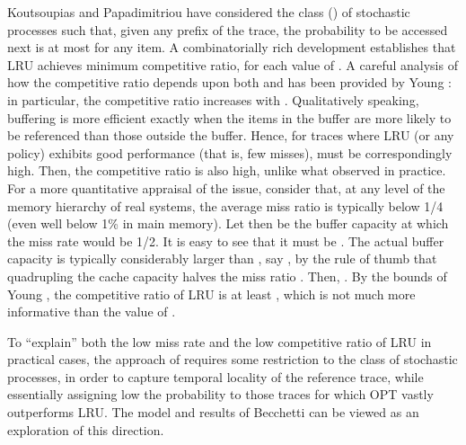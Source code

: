 \documentclass[11pt,a4paper]{article}
\theoremstyle{definition}
\theoremstyle{remark}
\begin{document}
Koutsoupias and Papadimitriou \cite{KoutsoupiasP00} have considered
the class  () of stochastic
processes such that, given any prefix of the trace, the probability to
be accessed next is at most  for any item.  A
combinatorially rich development establishes that LRU achieves minimum
competitive ratio, for each value of .  A careful analysis
of how the competitive ratio depends upon both  and  has
been provided by Young \cite{Young98}: in particular, the competitive
ratio increases with . Qualitatively speaking, buffering is
more efficient exactly when the items in the buffer are more likely to
be referenced than those outside the buffer. Hence, for traces where
LRU (or any policy) exhibits good performance (that is, few misses),
 must be correspondingly high. Then, the 
competitive ratio is also high, unlike what observed in practice.  For
a more quantitative appraisal of the issue, consider that, at any level
of the memory hierarchy of real systems, the average miss ratio is
typically below 1/4 (even well below 1\% in main memory). Let then
 be the buffer capacity at which the miss rate would be
1/2. It is easy to see that it must be .
The actual buffer capacity  is typically considerably larger than
, say , by the rule of thumb that
quadrupling the cache capacity halves the miss ratio
\cite{Przybylski90}.  Then, . By the bounds of
Young \cite{Young98}, the  competitive ratio of LRU
is at least , which is not much more informative than the value
 of \cite{SleatorT85}.

To ``explain'' both the low miss rate and the low competitive ratio of
LRU in practical cases, the approach of \cite{KoutsoupiasP00} requires
some restriction to the class of stochastic processes, in order to
capture temporal locality of the reference trace, while essentially
assigning low the probability to those traces for which OPT vastly
outperforms LRU.  The model and results of Becchetti
\cite{Becchetti04} can be viewed as an exploration of this direction.
\end{document}
